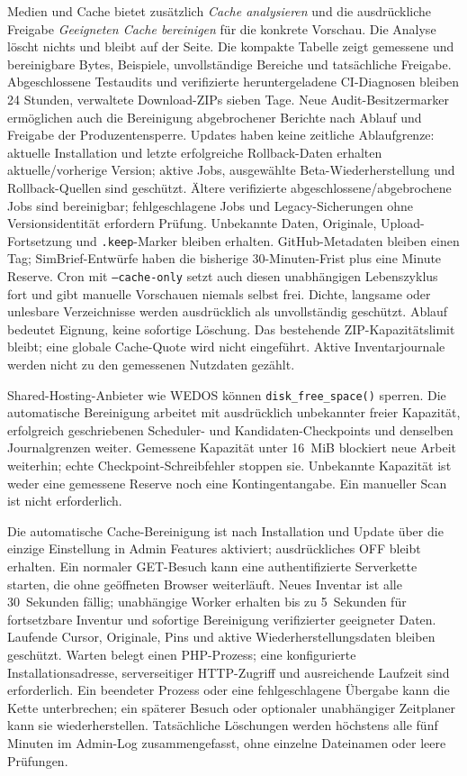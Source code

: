\documentclass[11pt,a4paper]{article}
\newcommand{\codeword}[1]{\nolinkurl{#1}}
\begin{document}
Medien und Cache bietet zusätzlich \emph{Cache analysieren} und die
ausdrückliche
Freigabe \emph{Geeigneten Cache bereinigen} für die konkrete Vorschau. Die
Analyse
löscht nichts und bleibt auf der Seite. Die kompakte Tabelle zeigt gemessene und
bereinigbare Bytes, Beispiele, unvollständige Bereiche und tatsächliche
Freigabe.
Abgeschlossene Testaudits und verifizierte heruntergeladene CI-Diagnosen bleiben
24 Stunden, verwaltete Download-ZIPs sieben Tage. Neue Audit-Besitzermarker
ermöglichen auch die Bereinigung abgebrochener Berichte nach Ablauf und Freigabe
der Produzentensperre. Updates haben keine zeitliche Ablaufgrenze: aktuelle
Installation und letzte erfolgreiche Rollback-Daten erhalten aktuelle/vorherige
Version; aktive Jobs, ausgewählte Beta-Wiederherstellung und Rollback-Quellen
sind
geschützt. Ältere verifizierte abgeschlossene/abgebrochene Jobs sind
bereinigbar;
fehlgeschlagene Jobs und Legacy-Sicherungen ohne Versionsidentität erfordern
Prüfung. Unbekannte Daten, Originale, Upload-Fortsetzung und
\texttt{.keep}-Marker
bleiben erhalten. GitHub-Metadaten bleiben einen Tag; SimBrief-Entwürfe haben
die
bisherige 30-Minuten-Frist plus eine Minute Reserve. Cron mit
\texttt{--cache-only} setzt auch diesen unabhängigen Lebenszyklus fort und gibt
manuelle Vorschauen niemals selbst frei. Dichte, langsame oder unlesbare
Verzeichnisse werden ausdrücklich als unvollständig geschützt. Ablauf bedeutet
Eignung, keine sofortige Löschung. Das bestehende ZIP-Kapazitätslimit bleibt;
eine globale Cache-Quote wird nicht eingeführt. Aktive Inventarjournale werden
nicht zu den gemessenen Nutzdaten gezählt.

Shared-Hosting-Anbieter wie WEDOS können \codeword{disk_free_space()} sperren.
Die automatische Bereinigung arbeitet mit ausdrücklich unbekannter freier
Kapazität, erfolgreich geschriebenen Scheduler- und Kandidaten-Checkpoints und
denselben Journalgrenzen weiter. Gemessene Kapazität unter 16~MiB blockiert neue
Arbeit weiterhin; echte Checkpoint-Schreibfehler stoppen sie. Unbekannte
Kapazität ist weder eine gemessene Reserve noch eine Kontingentangabe. Ein
manueller Scan ist nicht erforderlich.

Die automatische Cache-Bereinigung ist nach Installation und Update über die
einzige Einstellung in Admin Features aktiviert; ausdrückliches OFF bleibt
erhalten. Ein normaler GET-Besuch kann eine authentifizierte Serverkette
starten, die ohne geöffneten Browser weiterläuft. Neues Inventar ist alle
30~Sekunden fällig; unabhängige Worker erhalten bis zu 5~Sekunden für
fortsetzbare Inventur und sofortige Bereinigung verifizierter geeigneter Daten.
Laufende Cursor, Originale, Pins und aktive Wiederherstellungsdaten bleiben
geschützt. Warten belegt einen PHP-Prozess; eine konfigurierte
Installationsadresse, serverseitiger HTTP-Zugriff und ausreichende Laufzeit sind
erforderlich. Ein beendeter Prozess oder eine fehlgeschlagene Übergabe kann die
Kette unterbrechen; ein späterer Besuch oder optionaler unabhängiger Zeitplaner
kann sie wiederherstellen. Tatsächliche Löschungen werden höchstens alle fünf
Minuten im Admin-Log zusammengefasst, ohne einzelne Dateinamen oder leere
Prüfungen.
\end{document}
